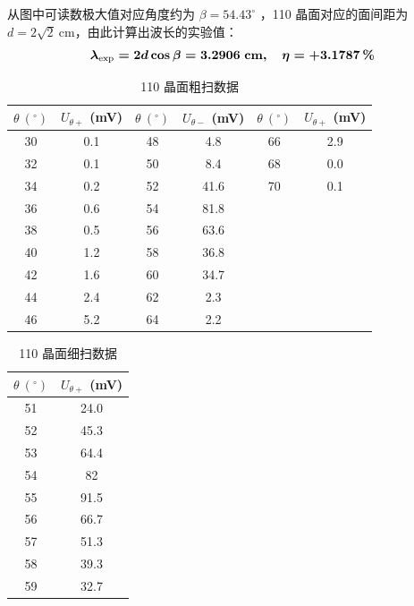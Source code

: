 \documentclass[UTF8]{article}
\theoremstyle{MyLineTheoremStyle} %
\theoremstyle{MyBlockTheoremStyle} %
\theoremstyle{MySubsubsectionStyle} %
\begin{document}
从图中可读数极大值对应角度约为 $\beta = 54.43^\circ$ ，110 晶面对应的面间距为 $d = 2\sqrt{2} \ \mathrm{cm}$，由此计算出波长的实验值：
\begin{equation}\boldmath
    \lambda_\text{exp} = 2d \cos \beta = 3.2906 \ \mathrm{cm},\quad \eta = + 3.1787 \,\%
\end{equation}

\begin{center}
\noindent\begin{minipage}{0.65\columnwidth}
\begin{table}[H]\centering
    \caption{110 晶面粗扫数据}
    \label{110 晶面粗扫数据}
    \begin{tabular}{cccccc}\toprule
        $\theta \ \mathrm{(^\circ)}$ & $U_{\theta+}$ (mV) & $\theta \ \mathrm{(^\circ)}$ & $U_{\theta-}$ (mV) & $\theta \ \mathrm{(^\circ)}$ & $U_{\theta+}$ (mV) \\ 
        \midrule
        30	&0.1	&48	&4.8	&66	&2.9    \\
        32	&0.1	&50	&8.4	&68	&0.0    \\
        34	&0.2	&52	&41.6	&70	&0.1    \\
        36	&0.6	&54	&81.8	&	&       \\
        38	&0.5	&56	&63.6	&	&       \\
        40	&1.2	&58	&36.8	&	&       \\
        42	&1.6	&60	&34.7	&	&       \\
        44	&2.4	&62	&2.3	&	&       \\
        46	&5.2	&64	&2.2	&	&       \\    
        \bottomrule
    \end{tabular}
\end{table}
\end{minipage}\hfill\begin{minipage}{0.32\columnwidth}
\begin{table}[H]\centering
    \caption{110 晶面细扫数据}
    \label{110 晶面细扫数据}
    \begin{tabular}{cc}\toprule
        $\theta \ \mathrm{(^\circ)}$ & $U_{\theta+}$ (mV) \\ 
        \midrule
        51&	24.0    \\
        52&	45.3    \\
        53&	64.4    \\
        54&	82      \\
        55&	91.5    \\
        56&	66.7    \\
        57&	51.3    \\
        58&	39.3    \\
        59&	32.7    \\       
        \bottomrule
    \end{tabular}
\end{table}
\end{minipage}\end{center}
\end{document}
